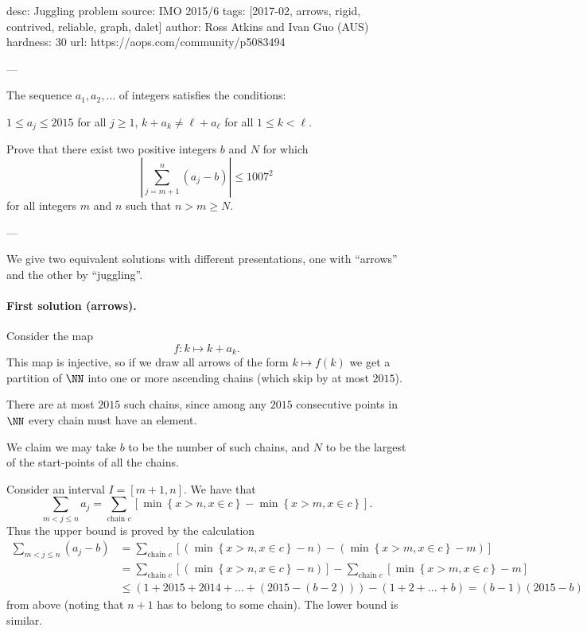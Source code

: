 desc: Juggling problem
source: IMO 2015/6
tags: [2017-02, arrows, rigid, contrived, reliable, graph, dalet]
author: Ross Atkins and Ivan Guo (AUS)
hardness: 30
url: https://aops.com/community/p5083494

---

The sequence $a_1,a_2,\dots$ of integers satisfies the conditions:
\begin{enumerate}[(i)]
  \ii $1\le a_j\le2015$ for all $j\ge1$,
  \ii $k+a_k\neq \ell+a_\ell$ for all $1\le k<\ell$.
\end{enumerate}
Prove that there exist two positive integers $b$ and $N$ for which
\[ \left\lvert\sum_{j=m+1}^n (a_j-b) \right\rvert \le 1007^2 \]
for all integers $m$ and $n$ such that $n > m\ge N$.

---

We give two equivalent solutions with different presentations,
one with ``arrows'' and the other by ``juggling''.

\paragraph{First solution (arrows).}
Consider the map
\[ f \colon k \mapsto k + a_k. \]
This map is injective, so if we draw all arrows of the form $k \mapsto f(k)$
we get a partition of $\NN$ into one or more ascending chains
(which skip by at most $2015$).

There are at most $2015$ such chains,
since among any $2015$ consecutive points in $\NN$
every chain must have an element.

We claim we may take $b$ to be the number of such chains,
and $N$ to be the largest of the start-points of all the chains.

Consider an interval $I = [m+1, n]$.
We have that
\[ \sum_{m<j\le n} a_j = \sum_{\text{chain } c} \left[ \min \left\{ x > n, x \in c \right\}
  - \min \left\{ x > m, x \in c \right\} \right]. \]
Thus the upper bound is proved by the calculation
\begin{align*}
  \sum_{m<j\le n} (a_j-b)
  &= \sum_{\text{chain } c} \left[ (\min \left\{ x > n, x \in c \right\} - n)
    - (\min \left\{ x > m, x \in c \right\} - m) \right] \\
  &= \sum_{\text{chain } c} \left[ (\min \left\{ x > n, x \in c \right\} - n) \right]
    - \sum_{\text{chain } c} \left[
    \min \left\{ x > m, x \in c \right\} - m \right] \\
  &\le (1+2015+2014+\dots+(2015-(b-2)))-(1+2+\dots+b) = (b-1)(2015-b)
\end{align*}
from above (noting that $n+1$ has to belong to some chain).
The lower bound is similar.

